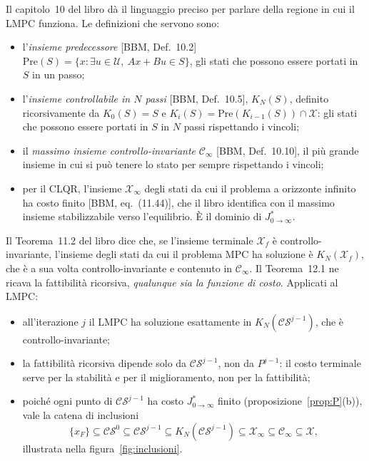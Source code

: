\documentclass[11pt,a4paper]{article}
\theoremstyle{definition}
\theoremstyle{plain}
\theoremstyle{remark}
\newcommand{\Xc}{\mathcal{X}}
\newcommand{\Uc}{\mathcal{U}}
\newcommand{\Xf}{\mathcal{X}_f}
\newcommand{\CS}{\mathcal{CS}}
\newcommand{\Jstar}{J^{*}_{0\to\infty}}
\newcommand{\libro}[1]{\textup{[BBM, #1]}} %
\begin{document}
Il capitolo~10 del libro dà il linguaggio preciso per parlare della regione in
cui il LMPC funziona. Le definizioni che servono sono:
\begin{itemize}
  \item l'\emph{insieme predecessore} \libro{Def.~10.2}
        $\mathrm{Pre}(S)=\{x: \exists u\in\Uc,\ Ax+Bu\in S\}$, gli stati che
        possono essere portati in $S$ in un passo;
  \item l'\emph{insieme controllabile in $N$ passi} \libro{Def.~10.5},
        $K_N(S)$, definito ricorsivamente da $K_0(S)=S$ e
        $K_i(S)=\mathrm{Pre}(K_{i-1}(S))\cap\Xc$: gli stati che possono essere
        portati in $S$ in $N$ passi rispettando i vincoli;
  \item il \emph{massimo insieme controllo-invariante} $\mathcal{C}_\infty$
        \libro{Def.~10.10}, il più grande insieme in cui si può tenere lo
        stato per sempre rispettando i vincoli;
  \item per il CLQR, l'insieme $\Xc_\infty$ degli stati da cui il problema
        a orizzonte infinito ha costo finito \libro{eq.~(11.44)}, che il
        libro identifica con il massimo insieme stabilizzabile verso
        l'equilibrio. È il dominio di $\Jstar$.
\end{itemize}
Il Teorema~11.2 del libro dice che, se l'insieme terminale $\Xf$ è
controllo-invariante, l'insieme degli stati da cui il problema MPC ha
soluzione è $K_N(\Xf)$, che è a sua volta controllo-invariante e contenuto in
$\mathcal{C}_\infty$. Il Teorema~12.1 ne ricava la fattibilità ricorsiva,
\emph{qualunque sia la funzione di costo}. Applicati al LMPC:
\begin{itemize}
  \item all'iterazione $j$ il LMPC ha soluzione esattamente in
        $K_N(\CS^{j-1})$, che è controllo-invariante;
  \item la fattibilità ricorsiva dipende solo da $\CS^{j-1}$, non da
        $P^{j-1}$: il costo terminale serve per la stabilità e per il
        miglioramento, non per la fattibilità;
  \item poiché ogni punto di $\CS^{j-1}$ ha costo $\Jstar$ finito
        (proposizione~\ref{prop:P}(b)), vale la catena di inclusioni
        \begin{equation}\label{eq:inclusioni}
          \{x_F\}\subseteq\CS^0\subseteq\CS^{j-1}\subseteq K_N(\CS^{j-1})
          \subseteq\Xc_\infty\subseteq\mathcal{C}_\infty\subseteq\Xc,
        \end{equation}
        illustrata nella figura~\ref{fig:inclusioni}.
\end{itemize}
\end{document}
